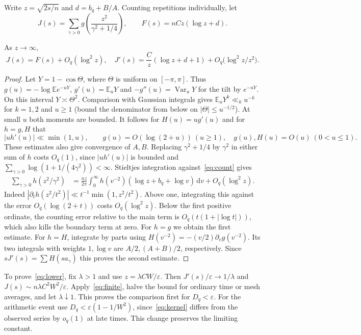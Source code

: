 \documentclass[11pt]{article}
\newcommand{\eps}{\varepsilon}\newcommand{\rd}{\operatorname{rd}}\newcommand{\EE}{\mathbb E}\newcommand{\PP}{\mathbb P}
\newcommand{\dd}{\,\mathrm d}\newcommand{\meas}{\operatorname{meas}}
\begin{document}
Write $z=\sqrt{2s/n}$ and $d=b_q+B/A$. Counting repetitions individually, let
\[
 J(s)=\sum_{\gamma>0}g\left(\frac{z^2}{\gamma^2+1/4}\right),\qquad
 F(s)=n C z(\log z+d).
\]
\begin{lemma}\label{lem:transform}
As $z\to\infty$,
\begin{equation}\label{eq:J}
 J(s)=F(s)+O_q(\log^2z),\quad
 J'(s)=\frac{C}{z}(\log z+d+1)+O_q\bigl(\log^2z/z^2\bigr).
\end{equation}
\end{lemma}
\begin{proof}
Let $Y=1-\cos\Theta$, where $\Theta$ is uniform on $[-\pi,\pi]$. Thus $g(u)=-\log\EE e^{-uY}$, $g'(u)=\EE_uY$ and $-g''(u)=\operatorname{Var}_uY$ for the tilt by $e^{-uY}$. On this interval $Y\asymp\Theta^2$. Comparison with Gaussian integrals gives $\EE_u Y^k\ll_k u^{-k}$ for $k=1,2$ and $u\ge1$ (bound the denominator from below on $|\Theta|\le u^{-1/2}$). At small $u$ both moments are bounded. It follows for $H(u)=ug'(u)$ and for $h=g,H$ that
\[
 |u h'(u)|\ll\min(1,u),\qquad
 g(u)=O(\log(2+u))\ (u\ge1),\quad g(u),H(u)=O(u)\ (0<u\le1).
\]
These estimates also give convergence of $A,B$. Replacing $\gamma^2+1/4$ by $\gamma^2$ in either sum of $h$ costs $O_q(1)$, since $|u h'(u)|$ is bounded and $\sum_{\gamma>0}\log(1+1/(4\gamma^2))<\infty$.
Stieltjes integration against~\eqref{eq:count} gives
\begin{align*}
 \sum_{\gamma>0}h(z^2/\gamma^2)&=
 \frac{nz}{2\pi}\int_0^\infty h(v^{-2})(\log z+b_q+\log v)\dd v+O_q(\log^2z).
\end{align*}
Indeed $|\partial_t h(z^2/t^2)|\ll t^{-1}\min(1,z^2/t^2)$. Above one, integrating this against the error $O_q(\log(2+t))$ costs $O_q(\log^2z)$. Below the first positive ordinate, the counting error relative to the main term is $O_q(t(1+|\log t|))$, which also kills the boundary term at zero. For $h=g$ we obtain the first estimate. For $h=H$, integrate by parts using $H(v^{-2})=-(v/2)\partial_v g(v^{-2})$. Its two integrals with weights $1,\log v$ are $A/2,(A+B)/2$, respectively. Since $sJ'(s)=\sum H(sa_\gamma)$ this proves the second estimate.
\end{proof}

To prove~\eqref{eq:lower}, fix $\lambda>1$ and use $z=\lambda C W/\eps$. Then $J'(s)/\eps\to1/\lambda$ and $J(s)\sim n\lambda C^2 W^2/\eps$. Apply~\eqref{eq:finite}, halve the bound for ordinary time or mesh averages, and let $\lambda\downarrow1$. This proves the comparison first for $D_q<\eps$. For the arithmetic event use $D_q<\eps(1-1/W^2)$, since~\eqref{eq:kernel} differs from the observed series by $o_q(1)$ at late times. This change preserves the limiting constant.
\end{document}
